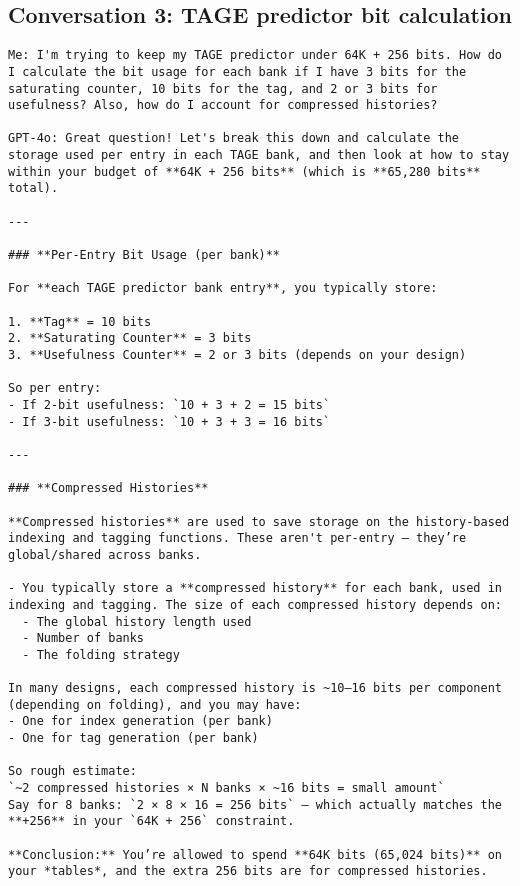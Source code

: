 \documentclass[sigconf, screen]{acmart}
\begin{document}
\subsection{Conversation 3: TAGE predictor bit calculation}
\begin{Verbatim}[fontsize=\tiny, breaklines=true]
Me: I'm trying to keep my TAGE predictor under 64K + 256 bits. How do I calculate the bit usage for each bank if I have 3 bits for the saturating counter, 10 bits for the tag, and 2 or 3 bits for usefulness? Also, how do I account for compressed histories?

GPT-4o: Great question! Let's break this down and calculate the storage used per entry in each TAGE bank, and then look at how to stay within your budget of **64K + 256 bits** (which is **65,280 bits** total).

---

### **Per-Entry Bit Usage (per bank)**

For **each TAGE predictor bank entry**, you typically store:

1. **Tag** = 10 bits  
2. **Saturating Counter** = 3 bits  
3. **Usefulness Counter** = 2 or 3 bits (depends on your design)  

So per entry:
- If 2-bit usefulness: `10 + 3 + 2 = 15 bits`
- If 3-bit usefulness: `10 + 3 + 3 = 16 bits`

---

### **Compressed Histories**

**Compressed histories** are used to save storage on the history-based indexing and tagging functions. These aren't per-entry — they’re global/shared across banks.

- You typically store a **compressed history** for each bank, used in indexing and tagging. The size of each compressed history depends on:
  - The global history length used
  - Number of banks
  - The folding strategy

In many designs, each compressed history is ~10–16 bits per component (depending on folding), and you may have:
- One for index generation (per bank)
- One for tag generation (per bank)

So rough estimate:  
`~2 compressed histories × N banks × ~16 bits = small amount`  
Say for 8 banks: `2 × 8 × 16 = 256 bits` — which actually matches the **+256** in your `64K + 256` constraint.

**Conclusion:** You’re allowed to spend **64K bits (65,024 bits)** on your *tables*, and the extra 256 bits are for compressed histories.


\end{Verbatim}
\end{document}
